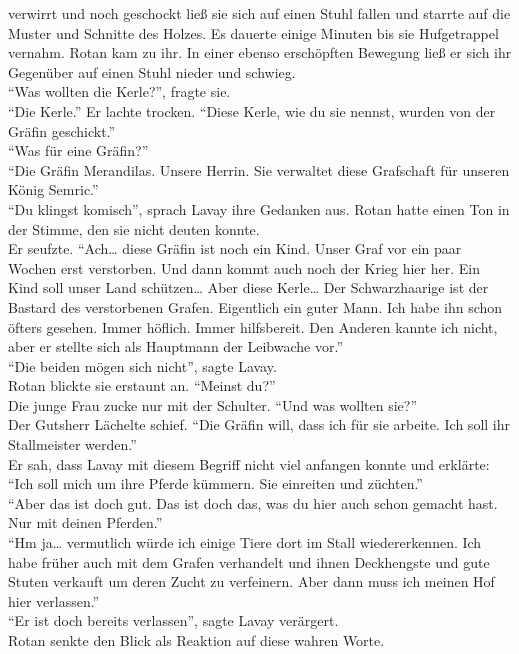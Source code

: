 verwirrt und noch geschockt ließ sie sich auf einen Stuhl fallen und starrte auf die Muster und 
Schnitte des Holzes. Es dauerte einige Minuten bis sie Hufgetrappel vernahm. Rotan kam zu ihr. In 
einer ebenso erschöpften Bewegung ließ er sich ihr Gegenüber auf einen Stuhl nieder und schwieg. \\
``Was wollten die Kerle?'', fragte sie.\\
``Die Kerle.'' Er lachte trocken. ``Diese Kerle, wie du sie nennst, wurden von der Gräfin 
geschickt.''\\
``Was für eine Gräfin?''\\
``Die Gräfin Merandilas. Unsere Herrin. Sie verwaltet diese Grafschaft für unseren König Semric.''\\
``Du klingst komisch'', sprach Lavay ihre Gedanken aus. Rotan hatte einen Ton in der Stimme, den 
sie nicht deuten konnte.\\
Er seufzte. ``Ach… diese Gräfin ist noch ein Kind. Unser Graf vor ein paar Wochen erst verstorben. 
Und dann kommt auch noch der Krieg hier her. Ein Kind soll unser Land schützen… Aber diese Kerle… 
Der Schwarzhaarige ist der Bastard des verstorbenen Grafen. Eigentlich ein guter Mann. Ich habe ihn 
schon öfters gesehen. Immer höflich. Immer hilfsbereit. Den Anderen kannte ich nicht, aber er 
stellte sich als Hauptmann der Leibwache vor.''\\
``Die beiden mögen sich nicht'', sagte Lavay.\\
Rotan blickte sie erstaunt an. ``Meinst du?''\\
Die junge Frau zucke nur mit der Schulter. ``Und was wollten sie?''\\
Der Gutsherr Lächelte schief. ``Die Gräfin will, dass ich für sie arbeite. Ich soll ihr 
Stallmeister werden.''\\
Er sah, dass Lavay mit diesem Begriff nicht viel anfangen konnte und erklärte: ``Ich soll mich um 
ihre Pferde kümmern. Sie einreiten und züchten.''\\
``Aber das ist doch gut. Das ist doch das, was du hier auch schon gemacht hast. Nur mit deinen 
Pferden.''\\
``Hm ja… vermutlich würde ich einige Tiere dort im Stall wiedererkennen. Ich habe früher auch mit 
dem Grafen verhandelt und ihnen Deckhengste und gute Stuten verkauft um deren Zucht zu verfeinern. 
Aber dann muss ich meinen Hof hier verlassen.''\\
``Er ist doch bereits verlassen'', sagte Lavay verärgert.\\
Rotan senkte den Blick als Reaktion auf diese wahren Worte.\\
